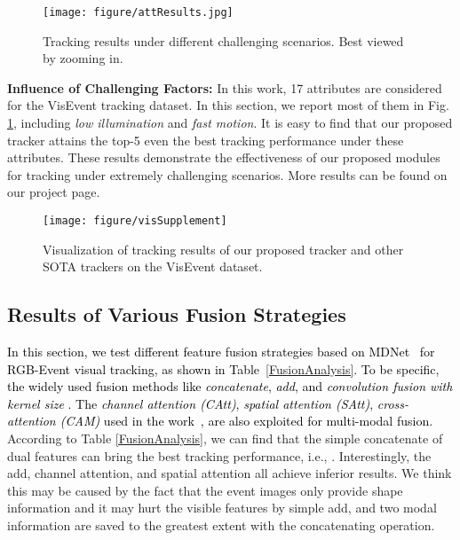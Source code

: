 \documentclass[journal]{IEEEtran}
\begin{document}
\begin{figure}
\center
\texttt{[image: figure/attResults.jpg]}
\caption{Tracking results under different challenging scenarios. Best viewed by zooming in.}   
\label{attributeResults}
\end{figure} 	


\noindent 
\textbf{Influence of Challenging Factors:}
In this work, 17 attributes are considered for the VisEvent tracking dataset. In this section, we report most of them in Fig. \ref{attributeResults}, including \emph{low illumination} and \emph{fast motion}. It is easy to find that our proposed tracker attains the top-5 even the best tracking performance under these attributes. These results demonstrate the effectiveness of our proposed modules for tracking under extremely challenging scenarios. More results can be found on our project page. 



\begin{figure}[!htp]
\center
\texttt{[image: figure/visSupplement]}
\caption{Visualization of tracking results of our proposed tracker and other SOTA trackers on the VisEvent dataset.}    
\label{visResults}
\end{figure} 	




\subsection{Results of Various Fusion Strategies}   

\textcolor{black}{
In this section, we test different feature fusion strategies based on MDNet~\cite{Nam2015Learning} for RGB-Event visual tracking, as shown in Table~\ref{FusionAnalysis}. To be specific, the widely used fusion methods like \emph{concatenate}, \emph{add}, and \emph{convolution fusion with kernel size} . The \emph{channel attention (CAtt)}, \emph{spatial attention (SAtt)}, \emph{cross-attention (CAM)} used in the work~\cite{suo2021CAM}, are also exploited for multi-modal fusion. 
}
According to Table \ref{FusionAnalysis}, we can find that the simple concatenate of dual features can bring the best tracking performance, i.e., . Interestingly, the add, channel attention, and spatial attention all achieve inferior results. We think this may be caused by the fact that the event images only provide shape information and it may hurt the visible features by simple add, and two modal information are saved to the greatest extent with the concatenating operation. 
\end{document}
